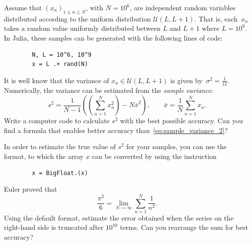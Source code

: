 \begin{compexercise}
    Assume that $(x_n)_{1 \leq n \leq N}$, with $N = 10^6$, are independent random variables distributed according to
    the uniform distribution $\mathcal U(L, L+1)$.
    That is, each~$x_n$ takes a random value uniformly distributed between $L$ and $L+1$ where $L = 10^9$.
    In Julia, these samples can be generated with the following lines of code:
    \begin{verbatim}
        N, L = 10^6, 10^9
        x = L .+ rand(N)
    \end{verbatim}
    It is well know that the variance of $x_n \in \mathcal U(L, L+1)$ is given by~$\sigma^2 = \frac{1}{12}$.
    Numerically, the variance can be estimated from the \emph{sample variance}:
    \begin{equation}
        \label{eq:sample_variance_2}
        s^2 = \frac{1}{N-1} \left(\left(\sum_{n=1}^{N} x_n^2\right) - N \bar x^2 \right),
        \qquad \bar x = \frac{1}{N} \sum_{n=1}^{N} x_n.
    \end{equation}
    Write a computer code to calculate $s^2$ with the best possible accuracy.
    Can you find a formula that enables better accuracy than~\eqref{eq:sample_variance_2}?
\end{compexercise}

\begin{remark}
    In order to estimate the true value of $s^2$ for your samples,
    you can use the  format,
    to which the array $x$ can be converted by using the instruction
    \begin{verbatim}
        x = BigFloat.(x)
    \end{verbatim}
\end{remark}

\begin{compexercise}
    Euler proved that
    \[
        \frac{\pi^2}{6} = \lim_{N \to \infty} \sum_{n=1}^{N} \frac{1}{n^2}.
    \]
    Using the default  format,
    estimate the error obtained when the series on the right-hand side is truncated after $10^{10}$ terms.
    Can you rearrange the sum for best accuracy?
\end{compexercise}

